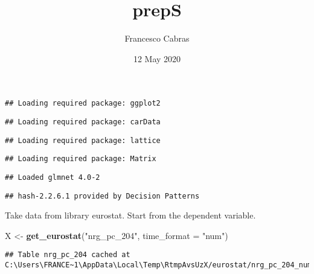\documentclass[
]{article}
\title{prepS}
\author{Francesco Cabras}
\date{12 May 2020}
\newenvironment{Shaded}{\begin{snugshade}}{\end{snugshade}}
\newcommand{\DataTypeTok}[1]{\textcolor[rgb]{0.13,0.29,0.53}{#1}}
\newcommand{\KeywordTok}[1]{\textcolor[rgb]{0.13,0.29,0.53}{\textbf{#1}}}
\newcommand{\NormalTok}[1]{#1}
\newcommand{\StringTok}[1]{\textcolor[rgb]{0.31,0.60,0.02}{#1}}
\begin{document}
\maketitle

\begin{verbatim}
## Loading required package: ggplot2
\end{verbatim}

\begin{verbatim}
## Loading required package: carData
\end{verbatim}

\begin{verbatim}
## Loading required package: lattice
\end{verbatim}

\begin{verbatim}
## Loading required package: Matrix
\end{verbatim}

\begin{verbatim}
## Loaded glmnet 4.0-2
\end{verbatim}

\begin{verbatim}
## hash-2.2.6.1 provided by Decision Patterns
\end{verbatim}

Take data from library eurostat. Start from the dependent variable.

\begin{Shaded}
\begin{Highlighting}[]
\NormalTok{X \textless{}{-}}\StringTok{ }\KeywordTok{get\_eurostat}\NormalTok{(}\StringTok{"nrg\_pc\_204"}\NormalTok{, }\DataTypeTok{time\_format =} \StringTok{"num"}\NormalTok{)}
\end{Highlighting}
\end{Shaded}

\begin{verbatim}
## Table nrg_pc_204 cached at C:\Users\FRANCE~1\AppData\Local\Temp\RtmpAvsUzX/eurostat/nrg_pc_204_num_code_FF.rds
\end{verbatim}
\end{document}
